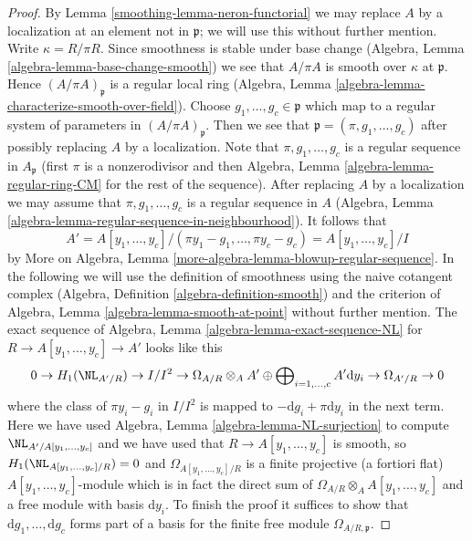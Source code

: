 \begin{proof}

By Lemma \ref{smoothing-lemma-neron-functorial} we may replace $A$ by a localization
at an element not in $\mathfrak p$; we will use this without further mention.
Write $\kappa = R/\pi R$. Since smoothness is stable under base change
(Algebra, Lemma \ref{algebra-lemma-base-change-smooth})
we see that $A/\pi A$ is smooth over $\kappa$ at $\mathfrak p$.
Hence $(A/\pi A)_\mathfrak p$ is a regular local ring
(Algebra, Lemma \ref{algebra-lemma-characterize-smooth-over-field}).
Choose $g_1, \ldots, g_c \in \mathfrak p$ which map to
a regular system of parameters in $(A/\pi A)_\mathfrak p$.
Then we see that $\mathfrak p = (\pi, g_1, \ldots, g_c)$
after possibly replacing $A$ by a localization.
Note that $\pi, g_1, \ldots, g_c$ is a regular sequence
in $A_\mathfrak p$ (first $\pi$ is a nonzerodivisor and
then Algebra, Lemma \ref{algebra-lemma-regular-ring-CM}
for the rest of the sequence).
After replacing $A$ by a localization we may assume that
$\pi, g_1, \ldots, g_c$ is a regular sequence in $A$
(Algebra, Lemma \ref{algebra-lemma-regular-sequence-in-neighbourhood}).
It follows that
$$
A' = A[y_1, \ldots, y_c]/(\pi y_1 - g_1, \ldots, \pi y_c - g_c) =
A[y_1, \ldots, y_c]/I
$$
by More on Algebra, Lemma \ref{more-algebra-lemma-blowup-regular-sequence}.
In the following we will use the definition of smoothness using the
naive cotangent complex (Algebra, Definition \ref{algebra-definition-smooth})
and the criterion of Algebra, Lemma \ref{algebra-lemma-smooth-at-point}
without further mention.
The exact sequence of Algebra, Lemma \ref{algebra-lemma-exact-sequence-NL}
for $R \to A[y_1, \ldots, y_c] \to A'$ looks like this
$$
0 \to H_1(\NL_{A'/R}) \to I/I^2 \to
\Omega_{A/R} \otimes_A A' \oplus
\bigoplus\nolimits_{i = 1, \ldots, c} A' \text{d}y_i \to
\Omega_{A'/R} \to 0
$$
where the class of $\pi y_i - g_i$ in $I/I^2$ is mapped
to $- \text{d}g_i + \pi \text{d}y_i$ in the next term.
Here we have used Algebra, Lemma \ref{algebra-lemma-NL-surjection}
to compute $\NL_{A'/A[y_1, \ldots, y_c]}$ and we have used that
$R \to A[y_1, \ldots, y_c]$ is smooth, so
$H_1(\NL_{A[y_1, \ldots, y_c]/R}) = 0$ and
$\Omega_{A[y_1, \ldots, y_c]/R}$ is a finite projective (a fortiori flat)
$A[y_1, \ldots, y_c]$-module which is in fact the direct sum
of $\Omega_{A/R} \otimes_A A[y_1, \ldots, y_c]$ and a free
module with basis $\text{d}y_i$. To finish the proof it
suffices to show that $\text{d}g_1, \ldots, \text{d}g_c$
forms part of a basis for the finite free module $\Omega_{A/R, \mathfrak p}$.

\end{proof}
